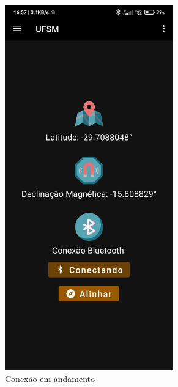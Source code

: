 \begin{figure}[!htb]
\begin{subfigure}[b]{0.3\textwidth}
		\includegraphics[width=0.8\textwidth]{figuras/desAplicativo/conectando}
		\caption{Conexão em andamento}
	\end{subfigure}
	\hfill
	\begin{subfigure}[b]{0.3\textwidth}
		\centering

\end{subfigure}
\end{figure}
